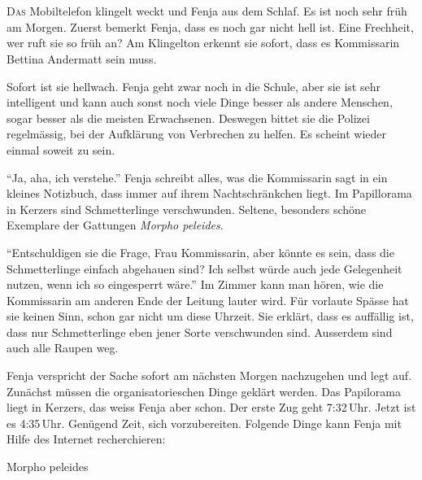 \chapter*{}
\lettrine[lines=3]{\color{red}D}{as} Mobiltelefon klingelt weckt und Fenja aus dem Schlaf. Es ist noch sehr früh am Morgen. Zuerst bemerkt Fenja, dass es noch gar nicht hell ist. Eine Frechheit, wer ruft sie so früh an? Am Klingelton erkennt sie sofort, dass es Kommissarin Bettina Andermatt sein muss.

Sofort ist sie hellwach. Fenja geht zwar noch in die Schule, aber sie ist sehr intelligent und kann auch sonst noch viele Dinge besser als andere Menschen, sogar besser als die meisten Erwachsenen. Deswegen bittet sie die Polizei regelmässig, bei der Aufklärung von Verbrechen zu helfen. Es scheint wieder einmal soweit zu sein.

\enquote{Ja, aha, ich verstehe.} Fenja schreibt alles, was die Kommissarin sagt in ein kleines Notizbuch, dass immer auf ihrem Nachtschränkchen liegt. Im Papillorama in Kerzers sind Schmetterlinge verschwunden. Seltene, besonders schöne Exemplare der Gattungen \emph{Morpho peleides}.

\enquote{Entschuldigen sie die Frage, Frau Kommissarin, aber könnte es sein, dass die Schmetterlinge einfach abgehauen sind? Ich selbst würde auch jede Gelegenheit nutzen, wenn ich so eingesperrt wäre.} Im Zimmer kann man hören, wie die Kommissarin am anderen Ende der Leitung lauter wird. Für vorlaute Spässe hat sie keinen Sinn, schon gar nicht um diese Uhrzeit. Sie erklärt, dass es auffällig ist, dass nur Schmetterlinge eben jener Sorte verschwunden sind. Ausserdem sind auch alle Raupen weg.

Fenja verspricht der Sache sofort am nächsten Morgen nachzugehen und legt auf. Zunächst müssen die organisatorieschen Dinge geklärt werden. Das Papilorama liegt in Kerzers, das weiss Fenja aber schon. Der erste Zug geht 7:32\,Uhr. Jetzt ist es 4:35\,Uhr. Genügend Zeit, sich vorzubereiten. Folgende Dinge kann Fenja mit Hilfe des Internet recherchieren:

\begin{description}
	\item[Morpho peleides] 
\end{description}

